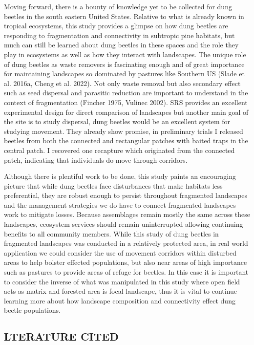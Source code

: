 \documentclass[
  man, donotrepeattitle]{apa6}
\begin{document}
Moving forward, there is a bounty of knowledge yet to be collected for dung beetles in the south eastern United States. Relative to what is already known in tropical ecosystems, this study provides a glimpse on how dung beetles are responding to fragmentation and connectivity in subtropic pine habitats, but much can still be learned about dung beetles in these spaces and the role they play in ecosystems as well as how they interact with landscapes. The unique role of dung beetles as waste removers is fascinating enough and of great importance for maintaining landscapes so dominated by pastures like Southern US (Slade et al. 2016a, Cheng et al. 2022). Not only waste removal but also secondary effect such as seed dispersal and parasitic reduction are important to understand in the context of fragmentation (Fincher 1975, Vulinec 2002). SRS provides an excellent experimental design for direct comparison of landscapes but another main goal of the site is to study dispersal, dung beetles would be an excellent system for studying movement. They already show promise, in preliminary trials I released beetles from both the connected and rectangular patches with baited traps in the central patch. I recovered one recapture which originated from the connected patch, indicating that individuals do move through corridors.

Although there is plentiful work to be done, this study paints an encouraging picture that while dung beetles face disturbances that make habitats less preferential, they are robust enough to persist throughout fragmented landscapes and the management strategies we do have to connect fragmented landscapes work to mitigate losses. Because assemblages remain mostly the same across these landscapes, ecosystem services should remain uninterrupted allowing continuing benefits to all community members. While this study of dung beetles in fragmented landscapes was conducted in a relatively protected area, in real world application we could consider the use of movement corridors within disturbed areas to help bolster effected populations, but also near areas of high importance such as pastures to provide areas of refuge for beetles. In this case it is important to consider the inverse of what was manipulated in this study where open field acts as matrix and forested area is focal landscape, thus it is vital to continue learning more about how landscape composition and connectivity effect dung beetle populations.

\subsection{LTERATURE CITED}\label{lterature-cited}
\end{document}
